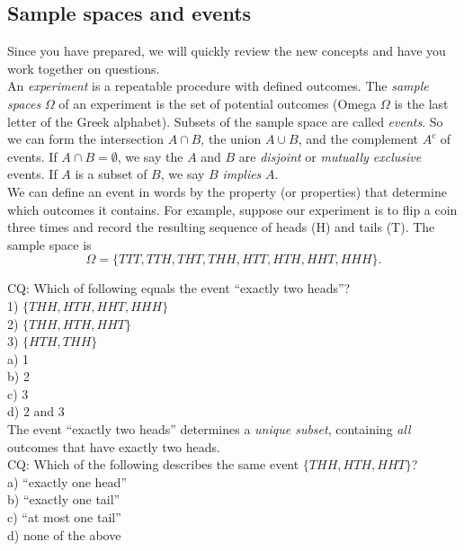 \subsection{Sample spaces and events}


Since you have prepared, we will quickly review the new concepts and have you work together on questions.\\

An {\em experiment} is a repeatable procedure with defined outcomes.  The {\em sample spaces} $\Omega$ of an experiment is the set of potential outcomes (Omega $\Omega$ is the last letter of the Greek alphabet).  Subsets of the sample space are called {\em events}.  So we can form the intersection $A \cap B$, the union $A \cup B$, and the complement $A^c$ of events.  If $A \cap B = \emptyset$, we say the $A$ and $B$ are {\em disjoint} or {\em mutually exclusive} events.  If $A$ is a subset of $B$, we say $B$ {\em implies} $A$. \\

We can define an event in words by the property (or properties) that determine which outcomes it contains.  For example, suppose our experiment is to flip a coin three times and record the resulting sequence of heads (H) and tails (T).  The sample space is $$\Omega = \{TTT, TTH, THT, THH, HTT, HTH, HHT, HHH\}.$$  

CQ: Which of following equals the event ``exactly two heads''? \\
1) $\{THH, HTH, HHT, HHH\}$ \\
2) $\{THH, HTH, HHT\}$ \\
3) $\{HTH, THH\}$ \\
a) 1 \\
b) 2 \\
c) 3 \\
d) 2 and 3 \\

The event ``exactly two heads'' determines a {\em unique subset}, containing {\em all} outcomes that have exactly two heads.\\

CQ: Which of the following describes the same event $\{THH, HTH, HHT\}$? \\
a) ``exactly one head'' \\
b) ``exactly one tail'' \\
c) ``at most one tail'' \\
d) none of the above \\

